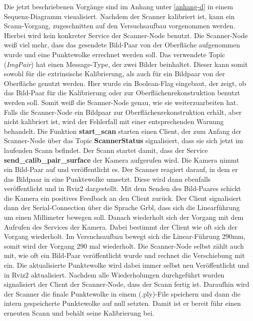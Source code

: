 		Die jetzt beschriebenen Vorgänge sind im Anhang unter \ref{anhang-d} in einem Sequenz-Diagramm visualisiert. \newline
		Nachdem der Scanner kalibriert ist, kann ein Scann-Vorgang, zugeschnitten auf den Versuchsaufbau vorgenommen werden. Hierbei wird kein konkreter Service der Scanner-Node benutzt. Die Scanner-Node weiß viel mehr, dass das gesendete Bild-Paar von der Oberfläche aufgenommen wurde und eine Punktewolke errechnet werden soll. Das verwendete Topic (\textit{ImgPair}) hat einen Message-Type, der zwei Bilder beinhaltet. Dieser kann somit sowohl für die extrinsische Kalibrierung, als auch für ein Bildpaar von der Oberfläche genutzt werden. Hier wurde ein Boolean-Flag eingebaut, der zeigt, ob das Bild-Paar für die Kalibrierung oder zur Oberflächenrekonstruktion benutzt werden soll. Somit weiß die Scanner-Node genau, wie sie weiterzuarbeiten hat. Falls die Scanner-Node ein Bildpaar zur Oberflächenrekonstruktion erhält, aber nicht kalibriert ist, wird der Fehlerfall mit einer entsprechenden Warnung behandelt. \newline
		Die Funktion \textbf{start\_scan} starten einen Client, der zum Anfang der Scanner-Node über das Topic \textbf{ScannerStatus} signalisiert, dass sie sich jetzt im laufenden Scann befindet. Der Scann startet damit, dass der Service \textbf{send\_calib\_pair\_surface} der Kamera aufgerufen wird. Die Kamera nimmt ein Bild-Paar auf und veröffentlicht es. Der Scanner reagiert darauf, in dem er das Bildpaar in eine Punktewolke umsetzt. Diese wird dann ebenfalls veröffentlicht und in Rviz2 dargestellt. Mit dem Senden des Bild-Paares schickt die Kamera ein positives Feedback an den Client zurück. Der Client signalisiert dann der Serial-Connection über die Sprache Grbl, dass sich die Linearführung um einen Millimeter bewegen soll. Danach wiederholt sich der Vorgang mit dem Aufrufen des Services der Kamera. Dabei bestimmt der Client wie oft sich der Vorgang wiederholt. Im Versuchsaufbau bewegt sich die Linear-Führung 290mm, somit wird der Vorgang 290 mal wiederholt. Die Scanner-Node selbst zählt auch mit, wie oft ein Bild-Paar veröffentlicht wurde und rechnet die Verschiebung mit ein. Die aktualisierte Punktewolke wird dabei immer selbst neu Veröffentlicht und in Rviz2 aktualisiert. \newline
		Nachdem alle Wiederholungen durchgeführt wurden signalisiert der Client der Scanner-Node, dass der Scann fertig ist. Daraufhin wird der Scanner die finale Punktewolke in einem (.ply)-File speichern und dann die intern gespeicherte Punktewolke auf null setzten. Damit ist er bereit führ einen erneuten Scann und behält seine Kalibrierung bei.
		
